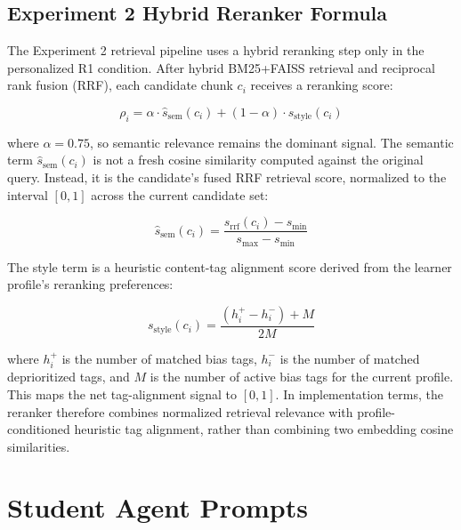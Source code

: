\subsection{Experiment 2 Hybrid Reranker Formula}
The Experiment 2 retrieval pipeline uses a hybrid reranking step only in the personalized R1 condition. After hybrid BM25+FAISS retrieval and reciprocal rank fusion (RRF), each candidate chunk $c_i$ receives a reranking score:

\begin{equation}
\rho_i = \alpha \cdot \hat{s}_{\mathrm{sem}}(c_i) + (1 - \alpha) \cdot s_{\mathrm{style}}(c_i)
\label{eq:exp2-hybrid-reranker}
\end{equation}

where $\alpha = 0.75$, so semantic relevance remains the dominant signal. The semantic term $\hat{s}_{\mathrm{sem}}(c_i)$ is not a fresh cosine similarity computed against the original query. Instead, it is the candidate's fused RRF retrieval score, normalized to the interval $[0,1]$ across the current candidate set:

\begin{equation}
\hat{s}_{\mathrm{sem}}(c_i) = \frac{s_{\mathrm{rrf}}(c_i) - s_{\min}}{s_{\max} - s_{\min}}
\label{eq:exp2-semantic-normalization}
\end{equation}

The style term is a heuristic content-tag alignment score derived from the learner profile's reranking preferences:

\begin{equation}
s_{\mathrm{style}}(c_i) = \frac{\left(h_i^{+} - h_i^{-}\right) + M}{2M}
\label{eq:exp2-style-score}
\end{equation}

where $h_i^{+}$ is the number of matched bias tags, $h_i^{-}$ is the number of matched deprioritized tags, and $M$ is the number of active bias tags for the current profile. This maps the net tag-alignment signal to $[0,1]$. In implementation terms, the reranker therefore combines normalized retrieval relevance with profile-conditioned heuristic tag alignment, rather than combining two embedding cosine similarities.

\section{Student Agent Prompts}
